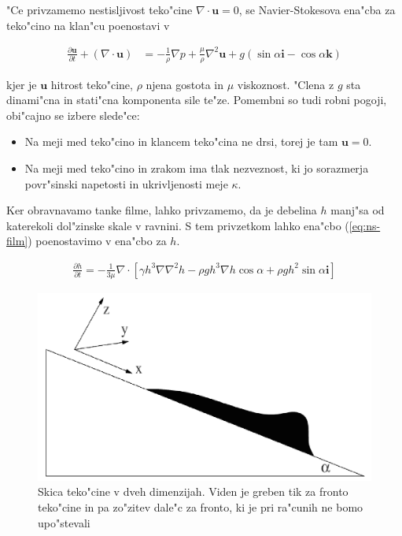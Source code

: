 \documentclass[a4paper,10pt]{article}
\renewcommand{\vec}{\mathbf}
\begin{document}
"Ce privzamemo nestisljivost teko"cine $\nabla \cdot \vec u = 0$, se Navier-Stokesova ena"cba za teko"cino na klan"cu poenostavi v 

\begin{align}
 \label{eq:ns-film}
 \frac{\partial \vec u}{\partial t} + (\nabla \cdot \vec u) &= -\frac{1}{\rho}\nabla p + \frac{\mu}{\rho}\nabla^2 \vec u + g (\sin \alpha \vec i - \cos \alpha \vec k)
\end{align}

kjer je $\vec u$ hitrost teko"cine, $\rho$ njena gostota in $\mu$ viskoznost. "Clena z $g$ sta dinami"cna in stati"cna komponenta sile te"ze. Pomembni so tudi robni pogoji, obi"cajno se izbere slede"ce:

\begin{itemize}
 \item Na meji med teko"cino in klancem teko"cina ne drsi, torej je tam $\vec u = 0$. 
 \item Na meji med teko"cino in zrakom ima tlak nezveznost, ki jo sorazmerja povr"sinski napetosti in ukrivljenosti meje $\kappa$. 
\end{itemize}

Ker obravnavamo tanke filme, lahko privzamemo, da je debelina $h$ manj"sa od katerekoli dol"zinske skale v ravnini. S tem privzetkom lahko ena"cbo (\ref{eq:ns-film}) poenostavimo v ena"cbo za $h$. 

\begin{align}
\label{eq:ns-film-h}
 \frac{\partial h}{\partial t} = -\frac{1}{3\mu}\nabla \cdot \left[ \gamma h^3 \nabla \nabla^2 h - \rho g h^3 \nabla h \cos \alpha + \rho g h^2 \sin \alpha \vec i \right]
\end{align}

\begin{figure}[h]
\centering
 \includegraphics[width=.8\textwidth]{./Slike/film-skica}
\caption{Skica teko"cine v dveh dimenzijah. Viden je greben tik za fronto teko"cine in pa zo"zitev dale"c za fronto, ki je pri ra"cunih ne bomo upo"stevali}
\label{fig:film-skica}
\end{figure}
\end{document}
